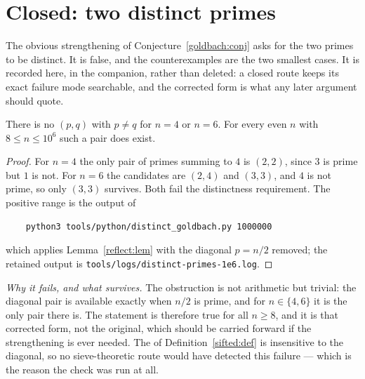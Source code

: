 \section{Closed: two distinct primes}\label{sec:distinct}

The obvious strengthening of Conjecture~\ref{goldbach:conj} asks for the two
primes to be distinct.  It is false, and the counterexamples are the two
smallest cases.  It is recorded here, in the companion, rather than deleted:
a closed route keeps its exact failure mode searchable, and the corrected form
is what any later argument should quote.

\begin{prop}\label{distinct:counter}
There is no  $(p,q)$ with $p\neq q$ for $n=4$ or $n=6$.
For every even $n$ with $8\leq n\leq10^{6}$ such a pair does exist.
\end{prop}

\begin{proof}
For $n=4$ the only pair of primes summing to $4$ is $(2,2)$, since $3$ is prime
but $1$ is not.  For $n=6$ the candidates are $(2,4)$ and $(3,3)$, and $4$ is
not prime, so only $(3,3)$ survives.  Both fail the distinctness requirement.
The positive range is the output of
\begin{verbatim}
    python3 tools/python/distinct_goldbach.py 1000000
\end{verbatim}
which applies Lemma~\ref{reflect:lem} with the diagonal $p=n/2$ removed; the
retained output is \texttt{tools/logs/distinct-primes-1e6.log}.
\end{proof}

\emph{Why it fails, and what survives.}  The obstruction is not arithmetic but
trivial: the diagonal pair is available exactly when $n/2$ is prime, and for
$n\in\{4,6\}$ it is the only pair there is.  The statement is therefore true
for all $n\geq8$, and it is that corrected form, not the original, which should
be carried forward if the strengthening is ever needed.  The 
of Definition~\ref{sifted:def} is insensitive to the diagonal, so no
sieve-theoretic route would have detected this failure --- which is the reason
the check was run at all.

